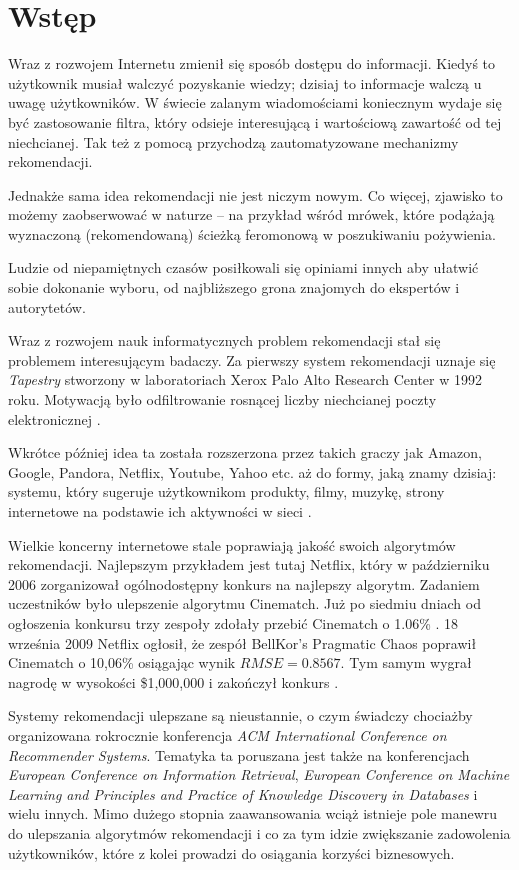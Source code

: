 \documentclass[twoside]{iisthesis}
\begin{document}
 \chapter{Wstęp}
	 Wraz z rozwojem Internetu zmienił się sposób dostępu do informacji. Kiedyś to użytkownik musiał walczyć pozyskanie wiedzy; dzisiaj to informacje walczą u uwagę użytkowników. W świecie zalanym wiadomościami koniecznym wydaje się być zastosowanie filtra, który odsieje interesującą  i wartościową zawartość od tej niechcianej. Tak też z pomocą przychodzą zautomatyzowane mechanizmy rekomendacji.
	 
	 Jednakże sama idea rekomendacji nie jest niczym nowym. Co więcej, zjawisko to możemy zaobserwować w naturze -- na przykład wśród mrówek, które podążają wyznaczoną (rekomendowaną) ścieżką feromonową w poszukiwaniu pożywienia.
	 
	 Ludzie od niepamiętnych czasów posiłkowali się opiniami innych aby ułatwić sobie dokonanie wyboru, od najbliższego grona znajomych do ekspertów i autorytetów.
	 
	 Wraz z rozwojem nauk informatycznych problem rekomendacji stał się problemem interesującym badaczy. Za pierwszy system rekomendacji uznaje się \textit{Tapestry} stworzony w laboratoriach Xerox Palo Alto Research Center w 1992 roku. Motywacją było odfiltrowanie rosnącej liczby niechcianej poczty elektronicznej \cite{id:FromTapestryToSVD}.
	 
	 Wkrótce później idea ta została rozszerzona przez takich graczy jak Amazon, Google, Pandora, Netflix, Youtube, Yahoo etc. aż do formy, jaką znamy dzisiaj: systemu, który sugeruje użytkownikom produkty, filmy, muzykę, strony internetowe na podstawie ich aktywności w sieci \cite{id:EvolutionOfRecommenderSystems}. 
	 
	 Wielkie koncerny internetowe stale poprawiają jakość swoich algorytmów rekomendacji. Najlepszym przykładem jest tutaj Netflix, który w październiku 2006 zorganizował ogólnodostępny konkurs na najlepszy algorytm. Zadaniem uczestników było ulepszenie algorytmu Cinematch. Już po siedmiu dniach od ogłoszenia konkursu trzy zespoły zdołały przebić Cinematch o 1.06\% \cite{id:NetflixPrize}\cite{id:NetflixPrizeRankings}. 18 września 2009 Netflix ogłosił, że zespół BellKor's Pragmatic Chaos poprawił Cinematch o 10,06\% osiągając wynik $RMSE = 0.8567$. Tym samym wygrał nagrodę w wysokości \$1,000,000 i zakończył konkurs \cite{id:NetflixPrize2}\cite{id:NetflixPrizeRules}.
	 
	 Systemy rekomendacji ulepszane są nieustannie, o czym świadczy chociażby organizowana rokrocznie konferencja\textit{ ACM International Conference on Recommender Systems}. Tematyka ta poruszana jest także na konferencjach \textit{European Conference on Information Retrieval}, \textit{European Conference on Machine Learning and Principles and Practice of Knowledge Discovery in Databases} i wielu innych. Mimo dużego stopnia zaawansowania wciąż istnieje pole manewru do ulepszania algorytmów rekomendacji i co za tym idzie zwiększanie zadowolenia użytkowników, które z kolei prowadzi do osiągania korzyści biznesowych.
	 
\end{document}
